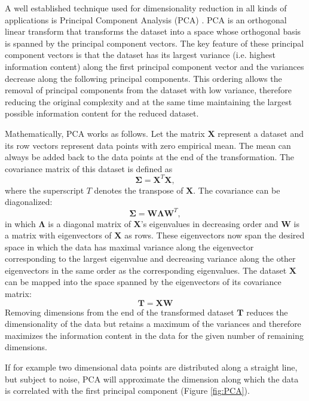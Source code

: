 \documentclass[english, a4paper, 12pt, titlepage, draft]{article}
\newcommand{\vect}[1]{\mathbf{#1}}
\begin{document}
A well established technique used for dimensionality reduction in all kinds of applications is Principal Component Analysis (PCA) \cite{PCAoriginal, PCA}.
PCA is an orthogonal linear transform that transforms the dataset into a space whose orthogonal basis is spanned by the principal component vectors.
The key feature of these principal component vectors is that the dataset has its largest variance (i.e. highest information content) along the first principal component vector and the variances decrease along the following principal components.
This ordering allows the removal of principal components from the dataset with low variance, therefore reducing the original complexity and at the same time maintaining the largest possible information content for the reduced dataset.

Mathematically, PCA works as follows.
Let the matrix $\vect{X}$ represent a dataset and its row vectors represent data points with zero empirical mean.
The mean can always be added back to the data points at the end of the transformation.
The covariance matrix of this dataset is defined as
\begin{equation}
    \vect{\Sigma} = \vect{X}^{T} \vect{X},
\end{equation}
where the superscript $T$ denotes the transpose of $\vect{X}$.
The covariance can be diagonalized:
\begin{equation}
    \vect{\Sigma} = \vect{W} \vect{\Lambda} \vect{W}^{T},
\end{equation}
in which $\vect{\Lambda}$ is a diagonal matrix of $\vect{X}$'s eigenvalues in decreasing order and $\vect{W}$ is a matrix with eigenvectors of $\vect{X}$ as rows.
These eigenvectors now span the desired space in which the data has maximal variance along the eigenvector corresponding to the largest eigenvalue and decreasing variance along the other eigenvectors in the same order as the corresponding eigenvalues.
The dataset $\vect{X}$ can be mapped into the space spanned by the eigenvectors of its covariance matrix:
\begin{equation}
    \vect{T} = \vect{X} \vect{W}
\end{equation}
Removing dimensions from the end of the transformed dataset $\vect{T}$ reduces the dimensionality of the data but retains a maximum of the variances and therefore maximizes the information content in the data for the given number of remaining dimensions.

If for example two dimensional data points are distributed along a straight line, but subject to noise, PCA will approximate the dimension along which the data is correlated with the first principal component (Figure \ref{fig:PCA}).
\end{document}

